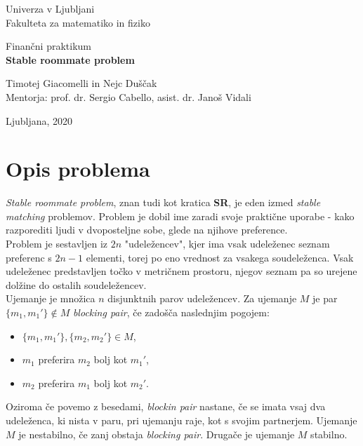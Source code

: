 \documentclass[12pt, a4paper]{article}
\begin{document}
\begin{titlepage}
\begin{center}

\large
Univerza v Ljubljani\\
\normalsize
Fakulteta za matematiko in fiziko\\

\vspace{5 cm} 

\large
Finančni praktikum \\


\vspace{0.5cm}
\LARGE
\textbf{Stable roommate problem}

\vspace{0.5 cm}

\large
Timotej Giacomelli in Nejc Duščak\\


\vspace{1.5cm}
\normalsize
Mentorja: prof. dr. Sergio Cabello, asist. dr. Janoš Vidali
\vspace{3cm}


\vfill

\large Ljubljana, 2020

\end{center}
\end{titlepage}


\newpage

\tableofcontents
\vspace{22mm}

\newpage

\section{Opis problema}
\textit{Stable roommate problem}, znan tudi kot kratica \textbf{SR}, je eden izmed \textit{stable matching} problemov. Problem je dobil ime zaradi svoje praktične uporabe - kako razporediti ljudi v dvoposteljne sobe, glede na njihove preference.\\

Problem je sestavljen iz $2n$ "udeležencev", kjer ima vsak udeleženec seznam preferenc s $2n - 1$ elementi, torej po eno vrednost za vsakega soudeleženca. Vsak udeleženec predstavljen točko v metričnem prostoru, njegov seznam pa so urejene dolžine do ostalih soudeležencev.\\

Ujemanje je množica $n$ disjunktnih parov udeležencev.
Za ujemanje $M$ je par $\{m_{1}, m_{1}' \} \notin M$ \textit{blocking pair}, če zadošča naslednjim pogojem:
\begin{itemize}
	\item  $\{m_{1}, m_{1}' \}, \{m_{2}, m_{2}' \} \in M$,
	\item $m_1$ preferira $m_2$ bolj kot $m_1'$,
	\item $m_2$ preferira $m_1$ bolj kot $m_2'$.
\end{itemize}
Oziroma če povemo z besedami, \textit{blockin pair} nastane, če se imata vsaj dva udeleženca, ki nista v paru, pri ujemanju raje, kot s svojim partnerjem.
Ujemanje $M$ je nestabilno, če zanj obstaja \textit{blocking pair}. Drugače je ujemanje $M$ stabilno.\\
\end{document}
